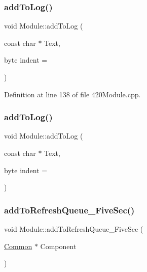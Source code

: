 \mbox{\label{class_module_a43676805f035e9640429667abdea07e6}} 
\subsubsection{\texorpdfstring{add\+To\+Log()}{addToLog()}\hspace{0.1cm}{\footnotesize\ttfamily [3/4]}}
{\footnotesize\ttfamily void Module\+::add\+To\+Log (\begin{DoxyParamCaption}\item[{const char $\ast$}]{Text,  }\item[{byte}]{indent = {} }\end{DoxyParamCaption})}



Definition at line 138 of file 420\+Module.\+cpp.

\mbox{\label{class_module_a43676805f035e9640429667abdea07e6}} 
\subsubsection{\texorpdfstring{add\+To\+Log()}{addToLog()}\hspace{0.1cm}{\footnotesize\ttfamily [4/4]}}
{\footnotesize\ttfamily void Module\+::add\+To\+Log (\begin{DoxyParamCaption}\item[{const char $\ast$}]{Text,  }\item[{byte}]{indent = {} }\end{DoxyParamCaption})}

\mbox{\label{class_module_a2dffaa526893d852b722cf890a6821c6}} 
\subsubsection{\texorpdfstring{add\+To\+Refresh\+Queue\+\_\+\+Five\+Sec()}{addToRefreshQueue\_FiveSec()}\hspace{0.1cm}{\footnotesize\ttfamily [1/2]}}
{\footnotesize\ttfamily void Module\+::add\+To\+Refresh\+Queue\+\_\+\+Five\+Sec (\begin{DoxyParamCaption}\item[{\hyperlink{class_common}{Common} $\ast$}]{Component }\end{DoxyParamCaption})}



